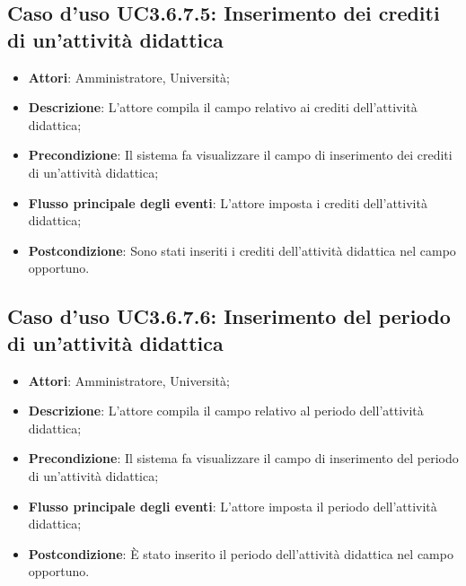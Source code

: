 \subsection{Caso d'uso \texorpdfstring{UC3.6.7.5}{UC3.6.7.5}: Inserimento dei crediti di un’attività didattica}
\begin{itemize}
\item \textbf{Attori}: Amministratore, Università;
\item \textbf{Descrizione}: L'attore compila il campo relativo ai crediti dell'attività didattica;

\item \textbf{Precondizione}: Il sistema fa visualizzare il campo di inserimento dei crediti di un'attività didattica;

\item \textbf{Flusso principale degli eventi}: L'attore imposta i crediti dell'attività didattica;

\item \textbf{Postcondizione}: Sono stati inseriti i crediti dell'attività didattica nel campo opportuno.

\end{itemize}
\subsection{Caso d'uso \texorpdfstring{UC3.6.7.6}{UC3.6.7.6}: Inserimento del periodo di un’attività didattica}
\begin{itemize}
\item \textbf{Attori}: Amministratore, Università;
\item \textbf{Descrizione}: L'attore compila il campo relativo al periodo dell'attività didattica;

\item \textbf{Precondizione}: Il sistema fa visualizzare il campo di inserimento del periodo di un'attività didattica;

\item \textbf{Flusso principale degli eventi}: L'attore imposta il periodo dell'attività didattica;

\item \textbf{Postcondizione}: È stato inserito il periodo dell'attività didattica nel campo opportuno.

\end{itemize}
